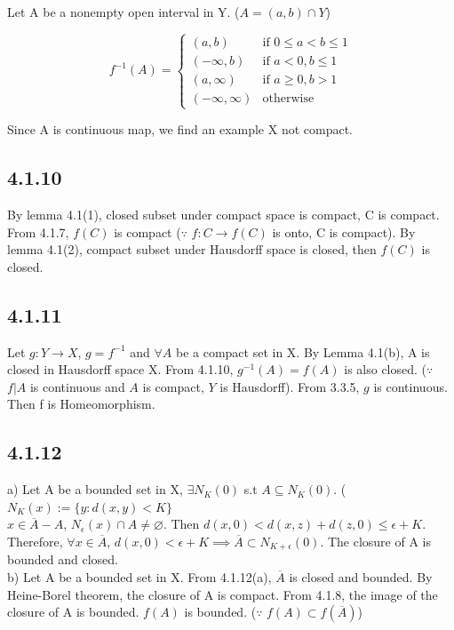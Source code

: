 \documentclass{article}
\let\emptyset\varnothing
\begin{document}
Let A be a nonempty open interval in Y. ($A=(a,b)\cap Y$)

\[
f^{-1}(A)=
\begin{cases}
(a,b) & \text{if } 0\leq a < b \leq1\\
(-\infty, b) & \text{if } a<0, b\leq1\\
(a, \infty) & \text{if } a\geq0, b>1\\
(-\infty,\infty) & \text{otherwise}
\end{cases}
\]

Since A is continuous map, we find an example X not compact.


\subsection*{4.1.10}

By lemma 4.1(1), closed subset under compact space is compact, C is compact. From 4.1.7, $f(C)$ is compact ($\because$ $f: C\to f(C)$ is onto, C is compact). By lemma 4.1(2), compact subset under Hausdorff space is closed, then $f(C)$ is closed.

\subsection*{4.1.11}

Let $g: Y\to X$, $g=f^{-1}$ and $\forall A$ be a compact set in X. By Lemma 4.1(b), A is closed in Hausdorff space X. From 4.1.10, $g^{-1}(A)=f(A)$ is also closed. ($\because$ $f|A$ is continuous and $A$ is compact, $Y$ is Hausdorff). From 3.3.5, $g$ is continuous. Then f is Homeomorphism.

\subsection*{4.1.12}

a) Let A be a bounded set in X, $\exists N_K(0)$ s.t $A\subseteq N_K(0)$. ($N_K(x):=\{y:d(x,y) < K\}$\\
$x \in \overline{A}-A$, $N_\epsilon(x) \cap A \neq \emptyset$. Then $d(x,0)<d(x,z)+d(z,0)\leq \epsilon+K$.\\
Therefore, $\forall x \in \overline{A}$, $d(x,0)<\epsilon+K \implies \overline{A}\subset N_{K+\epsilon}(0)$. The closure of A is bounded and closed.\\

b) Let A be a bounded set in X. From 4.1.12(a), $\overline{A}$ is closed and bounded. By Heine-Borel theorem, the closure of A is compact. From 4.1.8, the image of the closure of A is bounded. $f(A)$ is bounded. ($\because$ $f(A) \subset f(\overline{A})$)
\end{document}
